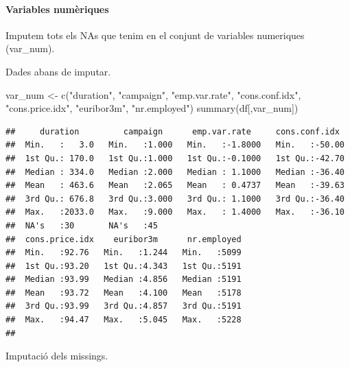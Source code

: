 \documentclass[
]{article}
\newenvironment{Shaded}{\begin{snugshade}}{\end{snugshade}}
\newcommand{\AttributeTok}[1]{\textcolor[rgb]{0.77,0.63,0.00}{#1}}
\newcommand{\DecValTok}[1]{\textcolor[rgb]{0.00,0.00,0.81}{#1}}
\newcommand{\FunctionTok}[1]{\textcolor[rgb]{0.00,0.00,0.00}{#1}}
\newcommand{\NormalTok}[1]{#1}
\newcommand{\OtherTok}[1]{\textcolor[rgb]{0.56,0.35,0.01}{#1}}
\newcommand{\SpecialCharTok}[1]{\textcolor[rgb]{0.00,0.00,0.00}{#1}}
\newcommand{\StringTok}[1]{\textcolor[rgb]{0.31,0.60,0.02}{#1}}
\begin{document}
\hypertarget{variables-numuxe8riques}{%
\paragraph{Variables numèriques}\label{variables-numuxe8riques}}

Imputem tots els NAs que tenim en el conjunt de variables numeriques
(var\_num).

Dades abans de imputar.

\begin{Shaded}
\begin{Highlighting}[]
\NormalTok{var\_num }\OtherTok{\textless{}{-}} \FunctionTok{c}\NormalTok{(}\StringTok{"duration"}\NormalTok{, }\StringTok{"campaign"}\NormalTok{, }\StringTok{"emp.var.rate"}\NormalTok{, }\StringTok{"cons.conf.idx"}\NormalTok{, }\StringTok{"cons.price.idx"}\NormalTok{, }\StringTok{"euribor3m"}\NormalTok{, }\StringTok{"nr.employed"}\NormalTok{)}
\FunctionTok{summary}\NormalTok{(df[,var\_num])}
\end{Highlighting}
\end{Shaded}

\begin{verbatim}
##     duration         campaign      emp.var.rate     cons.conf.idx   
##  Min.   :   3.0   Min.   :1.000   Min.   :-1.8000   Min.   :-50.00  
##  1st Qu.: 170.0   1st Qu.:1.000   1st Qu.:-0.1000   1st Qu.:-42.70  
##  Median : 334.0   Median :2.000   Median : 1.1000   Median :-36.40  
##  Mean   : 463.6   Mean   :2.065   Mean   : 0.4737   Mean   :-39.63  
##  3rd Qu.: 676.8   3rd Qu.:3.000   3rd Qu.: 1.1000   3rd Qu.:-36.40  
##  Max.   :2033.0   Max.   :9.000   Max.   : 1.4000   Max.   :-36.10  
##  NA's   :30       NA's   :45                                        
##  cons.price.idx    euribor3m      nr.employed  
##  Min.   :92.76   Min.   :1.244   Min.   :5099  
##  1st Qu.:93.20   1st Qu.:4.343   1st Qu.:5191  
##  Median :93.99   Median :4.856   Median :5191  
##  Mean   :93.72   Mean   :4.100   Mean   :5178  
##  3rd Qu.:93.99   3rd Qu.:4.857   3rd Qu.:5191  
##  Max.   :94.47   Max.   :5.045   Max.   :5228  
## 
\end{verbatim}

Imputació dels missings.

\begin{Shaded}
\end{Shaded}
\end{document}
